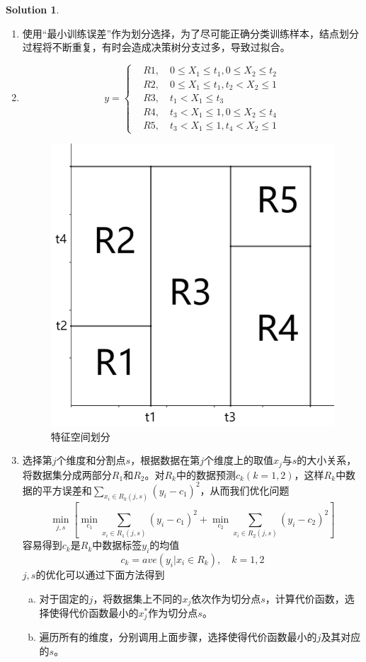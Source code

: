 \documentclass[a4paper,UTF8]{article}
\theoremstyle{definition}
\newtheorem*{solution}{Solution}
\begin{document}
\begin{solution}
	~\\
	\begin{enumerate}[(1)]
		\item 
		使用“最小训练误差”作为划分选择，为了尽可能正确分类训练样本，结点划分过程将不断重复，有时会造成决策树分支过多，导致过拟合。
		\item 
		\[
		y=\begin{cases}
		&R1,\quad 0\leq X_1\leq t_1, 0\leq X_2\leq t_2\\
		&R2,\quad 0\leq X_1\leq t_1, t_2<X_2\leq 1\\
		&R3,\quad t_1<X_1\leq t_3\\
		&R4,\quad t_3<X_1\leq 1, 0\leq X_2\leq t_4\\
		&R5,\quad t_3<X_1\leq 1, t_4<X_2\leq 1
		\end{cases}
		\]
		\begin{figure}[htbp]
			\centering
			\includegraphics[width=.4\textwidth]{figure1.png}
			\caption{特征空间划分}
		\end{figure}
		\item 
		选择第$j$个维度和分割点$s$，根据数据在第$j$个维度上的取值$x_j$与$s$的大小关系，将数据集分成两部分$R_1$和$R_2$。对$R_k$中的数据预测$c_k(k=1,2)$，这样$R_k$中数据的平方误差和$\sum\limits_{x_{i} \in R_{k}(j, s)}(y_{i}-c_{1})^2$，从而我们优化问题
		\[\min _{j, s}\left[\min _{c_1} \sum_{x_{i} \in R_{1}(j, s)}\left(y_{i}-c_{1}\right)^{2}+\min _{c_{2}} \sum_{x_{i} \in R_{2}(j, s)}\left(y_{i}-c_{2}\right)^{2}\right]\]
		容易得到$c_k$是$R_k$中数据标签$y_i$的均值
		\[c_k=ave(y_i|x_i\in R_k),\quad k=1,2\]
		$j,s$的优化可以通过下面方法得到
		\begin{enumerate}[(a)]
			\item 
			对于固定的$j$，将数据集上不同的$x_j$依次作为切分点$s$，计算代价函数，选择使得代价函数最小的$x_j^*$作为切分点$s$。
			\item 
			遍历所有的维度，分别调用上面步骤，选择使得代价函数最小的$j$及其对应的$s$。
		\end{enumerate}
	\end{enumerate}
\end{solution}
\end{document}
